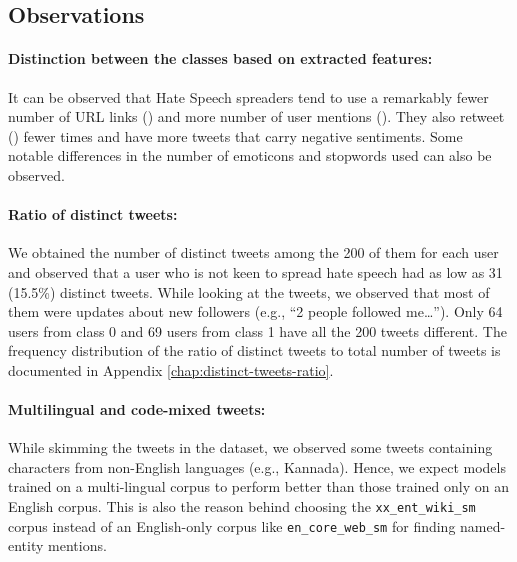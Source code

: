 \subsection{Observations}
\label{sec:dataset:eda-obs}
\paragraph{Distinction between the classes based on extracted features:} 
It can be observed that Hate Speech spreaders tend to use a remarkably fewer number of URL links (\maskUrl{}) and more number of user mentions (\maskUser{}). They also retweet (\maskRt{}) fewer times and have more tweets that carry negative sentiments. Some notable differences in the number of emoticons and stopwords used can also be observed.

\paragraph{Ratio of distinct tweets:}
We obtained the number of distinct tweets among the 200 of them for each user and observed that a user who is not keen to spread hate speech had as low as 31 (15.5\%) distinct tweets. While looking at the tweets, we observed that most of them were updates about new followers (e.g., ``2 people followed me…''). Only 64 users from class 0 and 69 users from class 1 have all the 200 tweets different. The frequency distribution of the ratio of distinct tweets to total number of tweets is documented in Appendix \ref{chap:distinct-tweets-ratio}.

\paragraph{Multilingual and code-mixed tweets:} While skimming the tweets in the dataset, we observed some tweets containing characters from non-English languages (e.g., Kannada). Hence, we expect models trained on a multi-lingual corpus to perform better than those trained only on an English corpus. This is also the reason behind choosing the \texttt{xx\_ent\_wiki\_sm} corpus instead of an English-only corpus like \texttt{en\_core\_web\_sm} for finding named-entity mentions.


